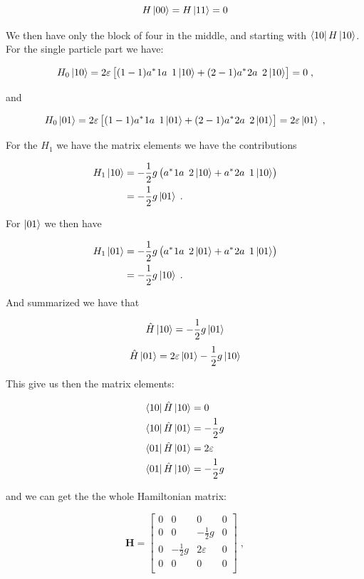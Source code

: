 $$ H \ket{00} = H\ket{11} = 0$$

 We then have only the block of four in the middle, and starting with $\bra{10}H\ket{10}$. For the single particle part we have: 

 $$H_0 \ket{10} = 2\varepsilon\left[(1-1)\hc{a}{1}\op{a}{1}\ket{10} + (2-1)\hc{a}{2}\op{a}{2}\ket{10}\right] = 0\; ,$$

 and

 
 $$H_0 \ket{01} = 2\varepsilon\left[(1-1)\hc{a}{1}\op{a}{1}\ket{01} + (2-1)\hc{a}{2}\op{a}{2}\ket{01} \right]=2\varepsilon\ket{01} \; ,$$
 
For the $H_1$ we have the matrix elements we have the contributions 

\begin{align*}
H_1\ket{10} &= -\frac{1}{2}g\left ( \hc{a}{1}\op{a}{2} \ket{10} + \hc{a}{2}\op{a}{1}\ket{10} \right) \\
            &=-\frac{1}{2}g \ket{01} \; .
\end{align*}

For $\ket{01}$ we then have

\begin{align*} 
H_1\ket{01} &= -\frac{1}{2}g\left ( \hc{a}{1}\op{a}{2} \ket{01} + \hc{a}{2}\op{a}{1}\ket{01} \right) \\
            &=-\frac{1}{2}g \ket{10} \; .
\end{align*}

And summarized we have that

$$\hat{H} \ket{10} =-\frac{1}{2}g \ket{01}$$
$$\hat{H} \ket{01} = 2\varepsilon\ket{01} - \frac{1}{2}g\ket{10}$$

This give us then the matrix elements:

\begin{align*}
  \bra{10}\hat{H} \ket{10} &= 0\\
  \bra{10}\hat{H} \ket{01} &= -\frac{1}{2}g\\
  \bra{01}\hat{H} \ket{01} &= 2\varepsilon\\
  \bra{01}\hat{H} \ket{10} &= -\frac{1}{2}g\\
\end{align*}

and we can get the the whole Hamiltonian matrix:

$$\mathbf{H} = \begin{bmatrix}
  0 & 0 & 0 & 0 \\
  0 & 0 & -\frac{1}{2}g & 0 \\
  0 & -\frac{1}{2}g & 2\varepsilon & 0 \\
  0 & 0 & 0 & 0 \\
\end{bmatrix} \; ,
$$

